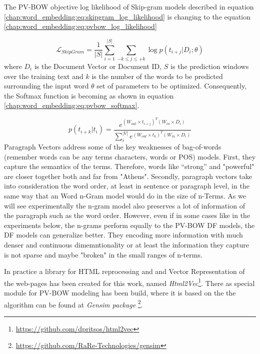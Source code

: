 The PV-BOW objective log likelihood of Skip-gram models described in equation \ref{chap:word_embedding:eq:skipgram_log_likelihood} is changing to the equation \ref{chap:word_embedding:eq:pvbow_log_likelihood}  

\begin{equation} \label{chap:word_embedding:eq:pvbow_log_likelihood}
	 \mathcal{L}_{SkipGram} = \frac{1}{|S|} \sum_{i=1}^{|S|}{ \sum_{-k \leq j \leq +k}{ \log {p(t_{i+j}|D_{i};\theta)}  } }
\end{equation}
\noindent
where $D_{i}$ is the Document Vector or Document ID, $S$ is the prediction windows over the training text and $k$ is the number of the words to be predicted surrounding the input word $\theta$ set of parameters to be optimized. Consequently,  the Softmax function is becoming as shown in equation \ref{chap:word_embedding:eq:pvbow_softmax}.

\begin{equation} \label{chap:word_embedding:eq:pvbow_softmax}
	p(t_{i+k}|t_{i}) = \frac{ e^{(W_{out}  \times  t_{i+j})^{T} (W_{in} \times  D_{i})}}{\sum^{|V|}_{i}{ e^{(W_{out}  \times  t_{k})^{T} (W_{in} \times  D_{i})}}} 
\end{equation}
Paragraph Vectors address some of the key weaknesses of bag-of-words (remember words can be any terms characters, words or POS) models. First, they capture the semantics of the terms. Therefore, words like “strong”  and "powerful" are closer together both and far from "Athens". Secondly, paragraph vectors take into consideration the word order, at least in sentence or paragraph level, in the same way that an Word n-Gram model would do in the size of n-Terms. As we will see experimentally the n-gram model also preserves a lot of information of the paragraph such as the word order. However, even if in some cases like in the experiments below, the n-grams perform equally to the PV-BOW DF models, the DF models can generalize better. They encoding more information with much denser and continuous dimemntionality or at least the information they capture is not sparse and maybe "broken" in the small ranges of n-terms.

In practice a library for HTML reprocessing and and Vector Representation of the web-pages has been created for this work, named  \textit{Html2Vec}\footnote{\url{https://github.com/dpritsos/html2vec}}. There as special module for PV-BOW modeling has been build, where it is based on the the algorithm can be found at \textit{Gensim package} \footnote{\url{https://github.com/RaRe-Technologies/gensim}}. 

